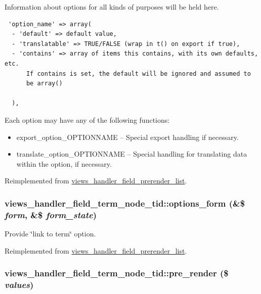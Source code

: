 Information about options for all kinds of purposes will be held here. 

\begin{Code}\begin{verbatim} 'option_name' => array(
  - 'default' => default value,
  - 'translatable' => TRUE/FALSE (wrap in t() on export if true),
  - 'contains' => array of items this contains, with its own defaults, etc.
      If contains is set, the default will be ignored and assumed to
      be array()

  ),
\end{verbatim}
\end{Code}

 Each option may have any of the following functions:\begin{itemize}
\item export\_\-option\_\-OPTIONNAME -- Special export handling if necessary.\item translate\_\-option\_\-OPTIONNAME -- Special handling for translating data within the option, if necessary. \end{itemize}


Reimplemented from \hyperlink{classviews__handler__field__prerender__list_3787d1e3974a37c72f71c062eee52b3d}{views\_\-handler\_\-field\_\-prerender\_\-list}.\hypertarget{classviews__handler__field__term__node__tid_0f0641c036e0a2498abd497cba1161a5}{
\subsubsection[{options\_\-form}]{\setlength{\rightskip}{0pt plus 5cm}views\_\-handler\_\-field\_\-term\_\-node\_\-tid::options\_\-form (\&\$ {\em form}, \/  \&\$ {\em form\_\-state})}}
\label{classviews__handler__field__term__node__tid_0f0641c036e0a2498abd497cba1161a5}


Provide \char`\"{}link to term\char`\"{} option. 

Reimplemented from \hyperlink{classviews__handler__field__prerender__list_6a88df29dbdd11aefc5d108dca6530e0}{views\_\-handler\_\-field\_\-prerender\_\-list}.\hypertarget{classviews__handler__field__term__node__tid_f3446d6e75ff34c2b165a5513a385c3b}{
\subsubsection[{pre\_\-render}]{\setlength{\rightskip}{0pt plus 5cm}views\_\-handler\_\-field\_\-term\_\-node\_\-tid::pre\_\-render (\$ {\em values})}}
\label{classviews__handler__field__term__node__tid_f3446d6e75ff34c2b165a5513a385c3b}


